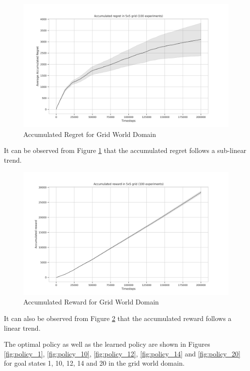 \begin{figure}[!htbp]
    \centering
    \includegraphics[width=\linewidth]{experimentation/images/Accumulated regret in 5x5 grid (100 experiments).png}
    \caption{Accumulated Regret for Grid World Domain}
    \label{fig:regret}
\end{figure}

It can be observed from Figure \ref{fig:regret} that the accumulated regret follows a sub-linear trend.

\begin{figure}[!htbp]
    \centering
    \includegraphics[width=\linewidth]{experimentation/images/Accumulated reward in 5x5 grid (100 experiments).png}
    \caption{Accumulated Reward for Grid World Domain}
    \label{fig:reward}
\end{figure}

It can also be observed from Figure \ref{fig:reward} that the accumulated reward follows a linear trend.

The optimal policy as well as the learned policy are shown in Figures \ref{fig:policy_1}, \ref{fig:policy_10}, \ref{fig:policy_12}, \ref{fig:policy_14} and \ref{fig:policy_20} for goal states 1, 10, 12, 14 and 20 in the grid world domain.

